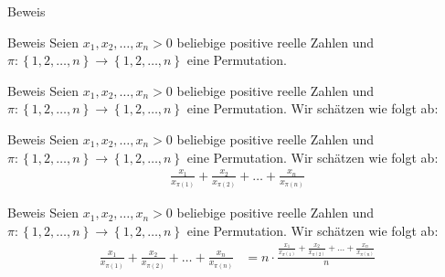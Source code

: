 \documentclass[10pt]{beamer}
\begin{document}
\begin{frame}{Beweis}
    
\end{frame}



\begin{frame}{Beweis}
    Seien \( x_{1}, x_{2}, \ldots, x_{n} > 0 \) beliebige positive reelle Zahlen und \( \pi: \left\{ 1, 2, \ldots, n \right\} \to \left\{ 1, 2, \ldots, n \right\} \) eine Permutation.
\end{frame}



\begin{frame}{Beweis}
    Seien \( x_{1}, x_{2}, \ldots, x_{n} > 0 \) beliebige positive reelle Zahlen und \( \pi: \left\{ 1, 2, \ldots, n \right\} \to \left\{ 1, 2, \ldots, n \right\} \) eine Permutation. Wir schätzen wie folgt ab:
\end{frame}



\begin{frame}{Beweis}
    Seien \( x_{1}, x_{2}, \ldots, x_{n} > 0 \) beliebige positive reelle Zahlen und \( \pi: \left\{ 1, 2, \ldots, n \right\} \to \left\{ 1, 2, \ldots, n \right\} \) eine Permutation. Wir schätzen wie folgt ab:
    \begin{align*}
        \frac{x_{1}}{x_{\pi\left( 1 \right)}} + \frac{x_{2}}{x_{\pi\left( 2 \right)}} + \ldots + \frac{x_{n}}{x_{\pi\left( n \right)}}
    \end{align*}
\end{frame}



\begin{frame}{Beweis}
    Seien \( x_{1}, x_{2}, \ldots, x_{n} > 0 \) beliebige positive reelle Zahlen und \( \pi: \left\{ 1, 2, \ldots, n \right\} \to \left\{ 1, 2, \ldots, n \right\} \) eine Permutation. Wir schätzen wie folgt ab:
    \begin{align*}
        \frac{x_{1}}{x_{\pi\left( 1 \right)}} + \frac{x_{2}}{x_{\pi\left( 2 \right)}} + \ldots + \frac{x_{n}}{x_{\pi\left( n \right)}}
        & = n \cdot \frac{\frac{x_{1}}{x_{\pi\left( 1 \right)}} + \frac{x_{2}}{x_{\pi\left( 2 \right)}} + \ldots + \frac{x_{n}}{x_{\pi\left( n \right)}}}{n} 
    \end{align*}
\end{frame}
\end{document}

